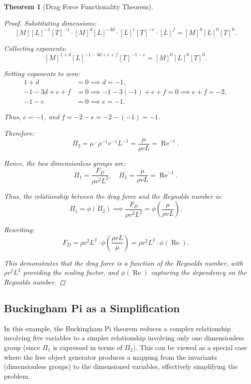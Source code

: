 \documentclass{article}
\newtheorem{theorem}{Theorem}[section]
\theoremstyle{definition}
\theoremstyle{remark}
\begin{document}
\begin{theorem}[Drag Force Functionality Theorem]
\begin{proof}
			Substituting dimensions:
			\[
			[M][L]^{-1}[T]^{-1} \cdot [M]^{d}[L]^{-3d} \cdot [L]^{e}[T]^{-e} \cdot [L]^f = [M]^0 [L]^0 [T]^0.
			\]
			
			Collecting exponents:
			\[
			[M]^{1 + d} [L]^{-1 - 3d + e + f} [T]^{-1 - e} = [M]^0 [L]^0 [T]^0.
			\]
			
			Setting exponents to zero:
			\begin{align*}
				1 + d &= 0 \implies d = -1, \\
				-1 - 3d + e + f &= 0 \implies -1 - 3(-1) + e + f = 0 \implies e + f = -2, \\
				-1 - e &= 0 \implies e = -1.
			\end{align*}
			
			Thus, $e = -1$, and $f = -2 - e = -2 - (-1) = -1$.
			
			Therefore:
			\[
			\Pi_2 = \mu \cdot \rho^{-1} v^{-1} L^{-1} = \dfrac{\mu}{\rho v L} = \operatorname{Re}^{-1}.
			\]
			
			Hence, the two dimensionless groups are:
			\[
			\Pi_1 = \dfrac{F_D}{\rho v^2 L^2}, \quad \Pi_2 = \dfrac{\mu}{\rho v L} = \operatorname{Re}^{-1}.
			\]
			
			Thus, the relationship between the drag force and the Reynolds number is:
			\[
			\Pi_1 = \phi(\Pi_2) \implies \dfrac{F_D}{\rho v^2 L^2} = \phi\left( \dfrac{\mu}{\rho v L} \right).
			\]
			
			Rewriting:
			\[
			F_D = \rho v^2 L^2 \cdot \phi\left( \dfrac{\rho v L}{\mu} \right) = \rho v^2 L^2 \cdot \phi(\operatorname{Re}).
			\]
			
			This demonstrates that the drag force is a function of the Reynolds number, with $\rho v^2 L^2$ providing the scaling factor, and $\phi(\operatorname{Re})$ capturing the dependency on the Reynolds number.
			
		\end{proof}
	\end{theorem}
	
	\subsection{Buckingham Pi as a Simplification}
	
	In this example, the Buckingham Pi theorem reduces a complex relationship involving five variables to a simpler relationship involving only one dimensionless group (since $\Pi_1$ is expressed in terms of $\Pi_2$). This can be viewed as a special case where the free object generator produces a mapping from the invariants (dimensionless groups) to the dimensioned variables, effectively simplifying the problem.
	
\end{document}
